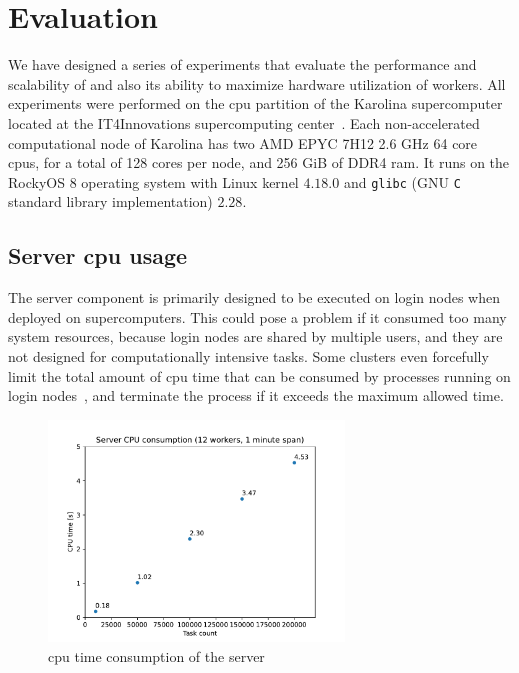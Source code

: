\section{Evaluation}
We have designed a series of experiments that evaluate the performance and scalability of
\hyperqueue{} and also its ability to maximize hardware utilization of workers. All
experiments were performed on the \gls{cpu} partition of the Karolina
supercomputer~\cite{karolina} located at the IT4Innovations supercomputing
center~\cite{it4i}. Each non-accelerated computational node of Karolina has two AMD
EPYC\texttrademark{} 7H12 2.6 GHz 64 core \glspl{cpu}, for a total of 128 cores
per node, and 256 GiB of DDR4 \gls{ram}. It runs on the RockyOS 8 operating system
with Linux kernel $4.18.0$ and \texttt{glibc} (GNU \texttt{C} standard library implementation) $2.28$.


\subsection{Server \gls{cpu} usage}
\label{sec:hq-exp-server-cpu-usage}
The \hyperqueue{} server component is primarily designed to be executed on login nodes
when deployed on supercomputers. This could pose a problem if it consumed too many system
resources, because login nodes are shared by multiple users, and they are not designed for
computationally intensive tasks. Some clusters even forcefully limit the total amount of
\gls{cpu} time that can be consumed by processes running on login
nodes~\cite{leonardo_time_limit}, and terminate the process if it exceeds the maximum allowed time.

\begin{figure}[h]
	\centering
	\includegraphics[width=0.7\textwidth]{imgs/hq/charts/server-utilization-tasks}
	\caption{\gls{cpu} time consumption of the \hyperqueue{} server}
	\label{fig:hq-server-cpu-consumption}
\end{figure}

